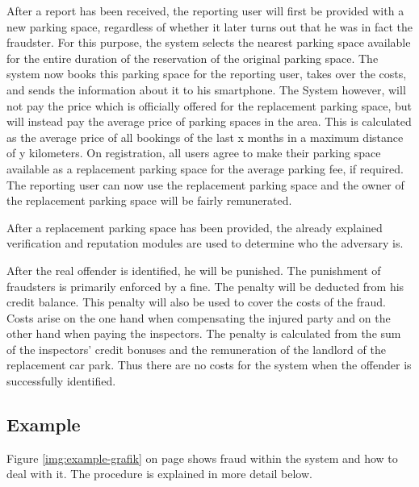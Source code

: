 After a report has been received, the reporting user will first be provided with a new parking space, regardless of whether it later turns out that he was in fact the fraudster. For this purpose, the system selects the nearest parking space available for the entire duration of the reservation of the original parking space. The system now books this parking space for the reporting user, takes over the costs, and sends the information about it to his smartphone. The System however, will not pay the price which is officially offered for the replacement parking space, but will instead pay the average price of parking spaces in the area. This is calculated as the average price of all bookings of the last x months in a maximum distance of y kilometers. On registration, all users agree to make their parking space available as a replacement parking space for the average parking fee, if required. The reporting user can now use the replacement parking space and the owner of the replacement parking space will be fairly remunerated.

After a replacement parking space has been provided, the already explained verification and reputation modules are used to determine who the adversary is.

After the real offender is identified, he will be punished. The punishment of fraudsters is primarily enforced by a fine. The penalty will be deducted from his credit balance. This penalty will also be used to cover the costs of the fraud. Costs arise on the one hand when compensating the injured party and on the other hand when paying the inspectors. The penalty is calculated from the sum of the inspectors' credit bonuses and the remuneration of the landlord of the replacement car park. Thus there are no costs for the system when the offender is successfully identified.

\subsection{Example}
Figure \ref{img:example-grafik} on page \pageref{img:example-grafik} shows fraud within the system and how to deal with it. The procedure is explained in more detail below.\\

